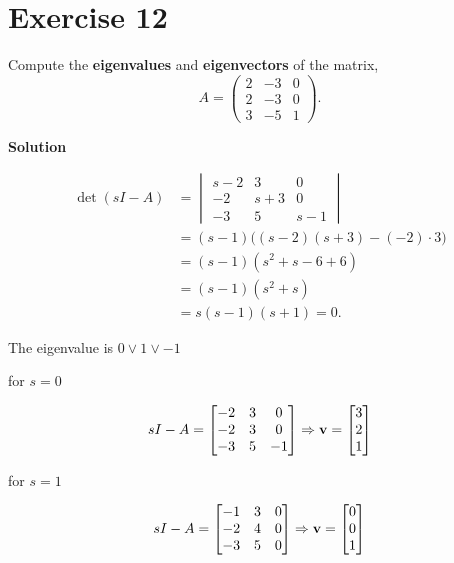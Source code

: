 \documentclass[12pt,a4paper]{article}
\begin{document}
\Needspace{9cm}
\section*{Exercise 12}
Compute the \textbf{eigenvalues} and \textbf{eigenvectors} of the matrix,
\[
A=\begin{pmatrix}
2 & -3 & 0\\
2 & -3 & 0\\
3 & -5 & 1
\end{pmatrix}.
\]

\textbf{Solution}

\begin{align*}
	\det(sI - A) &= \begin{vmatrix}
		s - 2 & 3 & 0 \\
		-2 & s + 3 & 0 \\
		-3 & 5 & s - 1
	\end{vmatrix} \\
	&= (s - 1)\big((s - 2)(s + 3) - (-2)\cdot 3\big) \\
	&= (s - 1)(s^2 + s - 6 + 6) \\
	&= (s - 1)(s^2 + s) \\
	&= s(s - 1)(s + 1) = 0.
\end{align*}

The eigenvalue is $ 0 \lor 1 \lor -1$

for $s = 0$

\begin{align*}
	sI - A = \begin{bmatrix}
		-2 & 3 & 0 \\
		-2 & 3 & 0 \\
		-3 & 5 & -1
	\end{bmatrix} \Rightarrow {\bf v} = \begin{bmatrix}
	3 \\ 2 \\ 1
	\end{bmatrix}
\end{align*}

for $ s=1$

\begin{align*}
	sI - A = \begin{bmatrix}
		-1 & 3 & 0 \\
		-2 & 4 & 0 \\
		-3 & 5 & 0
	\end{bmatrix} \Rightarrow {\bf v} = \begin{bmatrix}
		0 \\ 0 \\1
	\end{bmatrix}
\end{align*}
\end{document}
